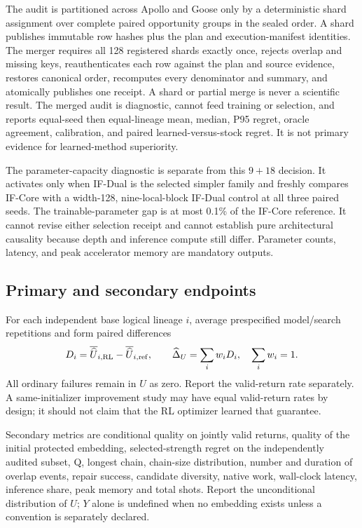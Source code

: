 \documentclass[11pt,a4paper]{article}
\theoremstyle{definition}\newtheorem{definition}[proposition]{Definition}
\begin{document}
The audit is partitioned across Apollo and Goose only by a deterministic shard assignment over complete paired opportunity groups in the sealed order. A shard publishes immutable row hashes plus the plan and execution-manifest identities. The merger requires all 128 registered shards exactly once, rejects overlap and missing keys, reauthenticates each row against the plan and source evidence, restores canonical order, recomputes every denominator and summary, and atomically publishes one receipt. A shard or partial merge is never a scientific result. The merged audit is diagnostic, cannot feed training or selection, and reports equal-seed then equal-lineage mean, median, P95 regret, oracle agreement, calibration, and paired learned-versus-stock regret. It is not primary evidence for learned-method superiority.

The parameter-capacity diagnostic is separate from this $9+18$ decision. It activates only when IF-Dual is the selected simpler family and freshly compares IF-Core with a width-128, nine-local-block IF-Dual control at all three paired seeds. The trainable-parameter gap is at most 0.1\% of the IF-Core reference. It cannot revise either selection receipt and cannot establish pure architectural causality because depth and inference compute still differ. Parameter counts, latency, and peak accelerator memory are mandatory outputs.

\subsection{Primary and secondary endpoints}
For each independent base logical lineage $i$, average prespecified model/search repetitions and form paired differences
\begin{equation}
D_i=\overline{\widehat U}_{i,\rm RL}-\overline{\widehat U}_{i,\rm ref},\qquad
\widehat\Delta_U=\sum_i w_iD_i,\quad \sum_iw_i=1.
\end{equation}
All ordinary failures remain in $\widehat U$ as zero. Report the valid-return rate separately. A same-initializer improvement study may have equal valid-return rates by design; it should not claim that the RL optimizer learned that guarantee.

Secondary metrics are conditional quality on jointly valid returns, quality of the initial protected embedding, selected-strength regret on the independently audited subset, Q, longest chain, chain-size distribution, number and duration of overlap events, repair success, candidate diversity, native work, wall-clock latency, inference share, peak memory and total shots. Report the unconditional distribution of $U$; $Y$ alone is undefined when no embedding exists unless a convention is separately declared.
\end{document}
